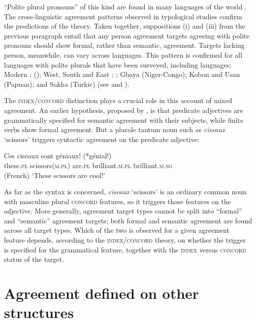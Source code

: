 \documentclass[output=paper,biblatex,babelshorthands,newtxmath,draftmode,colorlinks,citecolor=brown]{langscibook}
\begin{document}
``Polite plural pronouns'' of this kind are found in many languages of the world \citep{Head:1978}.   The cross-linguistic agreement patterns observed in typological studies \citep{Comrie:1975,Wechsler:2011} confirm the predictions of the theory.  Taken together, suppositions (i) and (iii) from the previous paragraph entail that any person agreement targets agreeing with polite pronouns should show formal, rather than semantic, agreement.  Targets lacking person, meanwhile, can vary across languages.  This pattern is confirmed for all languages with polite plurals that have been surveyed, including  languages; Modern ;  (); West, South and East ; ; Gbaya (Niger-Congo);  Kobon and Usan (Papuan); and Sakha (Turkic) (see \citealt{Comrie:1975} and \citealt{Wechsler:2011}).   
 
The \textsc{index/concord} distinction plays a crucial role in this account of mixed agreement.  An earlier hypothesis, proposed by \citet[230]{Kathol99b}, is that  predicate adjectives are grammatically specified for semantic  agreement with their subjects, while finite verbs show formal agreement.  But a plurale tantum noun such as \textit{ciseaux} `scissors’ triggers syntactic agreement on the predicate adjective:
	
\begin{exe} 
\ex\label{ciseaux}
\gll Ces	       ciseaux	               sont	       g\'{e}niaux!	       (*g\'{e}nial!) \\
     these.\textsc{pl} scissors(\textsc{m.pl}) are.\textsc{pl} brilliant.\textsc{m.pl} \hphantom{(*}brilliant.\textsc{m.sg} \\\hfill(French)
\glt		`These scissors are cool!’ 
\end{exe}

\noindent
As far as the syntax is concerned, \textit{ciseaux} `scissors’ is an ordinary common noun with masculine plural \textsc{concord} features, so it triggers those features on the adjective.  More generally, agreement target types cannot be split into ``formal'' and ``semantic'' agreement targets; both formal and semantic agreement are found across all target types.  Which of the two is observed for a given agreement feature depends, according to the  \textsc{index/concord}  theory,  on whether the trigger is specified for the grammatical feature, together with the  \textsc{index}  versus  \textsc{concord}  status of the target.  
 

\section{Agreement defined on other structures}
\end{document}
